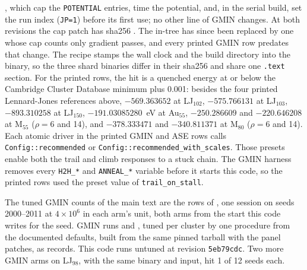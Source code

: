 \documentclass[journal=jctcce,manuscript=suppinfo]{achemso}
\begin{document}
, which cap the
\texttt{POTENTIAL} entries, time the potential, and, in the serial build, set
the run index (\texttt{JP=1}) before its first use; no other line of GMIN
changes.
At both revisions the cap patch has sha256
\texttt{}.
The in-tree  has since been
replaced by one whose cap counts only gradient passes, and every printed
GMIN row predates that change.
The recipe stamps the wall clock and the build directory into the binary, so the three shard binaries differ in their sha256 and share one \texttt{.text} section.
For the printed rows, the hit is a quenched energy at or below the Cambridge
Cluster Database minimum plus 0.001: besides the four printed Lennard-Jones
references above,
\(-569.363652\) at LJ\(_{102}\), \(-575.766131\) at LJ\(_{103}\),
\(-893.310258\) at LJ\(_{150}\), \(-191.03085280\)~eV at Au\(_{55}\),
\(-250.286609\) and \(-220.646208\) at M\(_{55}\) (\(\rho=6\) and 14), and
\(-378.333471\) and \(-340.811371\) at M\(_{80}\) (\(\rho=6\) and 14).
\cite{walesCambridgeClusterDatabase}
Each atomic driver in the printed GMIN and ASE rows calls
\texttt{Config::recommended} or \texttt{Config::recommended\_with\_scales}.
Those presets enable both the trail and climb responses to a stuck chain.
The GMIN harness removes every \texttt{H2H\_*} and \texttt{ANNEAL\_*}
variable before it starts this code, so the printed rows used the preset
value of \texttt{trail\_on\_stall}.

The tuned GMIN counts of the main text are the rows of
, one session on seeds 2000--2011
at \(4\times 10^{6}\) in each arm's unit, both arms from the start this code
writes for the seed.
GMIN runs  and
, tuned per cluster by one procedure from the documented
defaults, built from the same pinned tarball with the panel patches, as
 records.
This code runs untuned at revision \texttt{5eb79cdc}.
Two more GMIN arms on LJ\(_{98}\), with the same binary and input, hit 1 of
12 seeds each.
\end{document}
